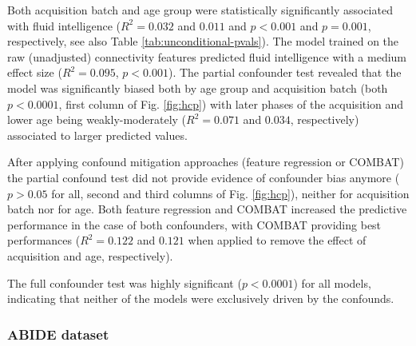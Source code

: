 \documentclass{article}
\begin{document}
Both acquisition batch and age group were statistically significantly associated with fluid intelligence ($R^2=0.032$ and $0.011$ and $p<0.001$ and $p=0.001$, respectively, see also Table \ref{tab:unconditional-pvals}). The model trained on the raw (unadjusted) connectivity features predicted fluid intelligence with a medium effect size ($R^2=0.095$, $p<0.001$).
The partial confounder test revealed that the model was significantly biased both by age group and acquisition batch (both $p<0.0001$, first column of Fig. \ref{fig:hcp}) with later phases of the acquisition and lower age being weakly-moderately ($R^2=0.071$ and $0.034$, respectively) associated to larger predicted values.

After applying confound mitigation approaches (feature regression or COMBAT) the partial confound test did not provide evidence of confounder bias anymore ($p > 0.05$ for all, second and third columns of Fig. \ref{fig:hcp}), neither for acquisition batch nor for age. Both feature regression and COMBAT increased the predictive performance in the case of both confounders, with COMBAT providing best performances ($R^2=0.122$ and $0.121$ when applied to remove the effect of acquisition and age, respectively).

The full confounder test was highly significant ($p<0.0001$) for all models, indicating that neither of the models were exclusively driven by the confounds.

\subsubsection*{ABIDE dataset}
\end{document}
